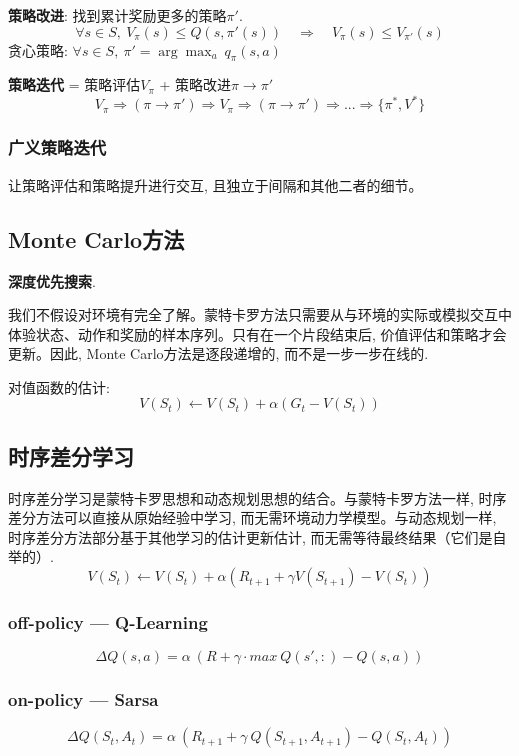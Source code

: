 \documentclass{article}
\begin{document}
            \textbf{策略改进}: 找到累计奖励更多的策略$\pi'$.
                $$\forall s \in S,\ V_\pi(s) \le Q(s, \pi'(s)) \quad \Rightarrow \quad V_\pi(s) \le V_{\pi'}(s)$$
                贪心策略: $\forall s \in S,\ \pi' = \arg\max_a\ q_\pi (s,a)$
                
            \textbf{策略迭代} = 策略评估$V_{\pi}$ + 策略改进$\pi \to \pi'$
                $$V_{\pi} \Rightarrow (\pi \to \pi') \Rightarrow V_{\pi} \Rightarrow (\pi \to \pi') \Rightarrow ... \Rightarrow \{\pi^*, V^*\}$$
        
        \subsubsection{广义策略迭代}
            让策略评估和策略提升进行交互, 且独立于间隔和其他二者的细节。
    
    \subsection{Monte Carlo方法}
        \textbf{深度优先搜索}.
    
        我们不假设对环境有完全了解。蒙特卡罗方法只需要从与环境的实际或模拟交互中体验状态、动作和奖励的样本序列。只有在一个片段结束后, 价值评估和策略才会更新。因此, Monte Carlo方法是逐段递增的, 而不是一步一步在线的.
        
        对值函数的估计:
            $$V\left(S_{t}\right) \leftarrow V\left(S_{t}\right)+\alpha\left(G_{t}-V\left(S_{t}\right)\right)$$

    \subsection{时序差分学习}
        时序差分学习是蒙特卡罗思想和动态规划思想的结合。与蒙特卡罗方法一样, 时序差分方法可以直接从原始经验中学习, 而无需环境动力学模型。与动态规划一样, 时序差分方法部分基于其他学习的估计更新估计, 而无需等待最终结果（它们是自举的）.
            $$V\left(S_{t}\right) \leftarrow V\left(S_{t}\right)+\alpha\left(R_{t+1}+\gamma V\left(S_{t+1}\right)-V\left(S_{t}\right)\right)$$
    
    	\subsubsection{off-policy --- Q-Learning}
    	    $$\Delta Q(s,a) = \alpha\ ( R + \gamma \cdot max\ Q(s',:) - Q(s,a))$$
    	    
    	\subsubsection{on-policy --- Sarsa}
    	    $$\Delta Q(S_{t},A_{t}) = \alpha\ ( R_{t+1} + \gamma\ Q(S_{t+1}, A_{t+1}) - Q(S_t, A_t))$$
    	
\end{document}
